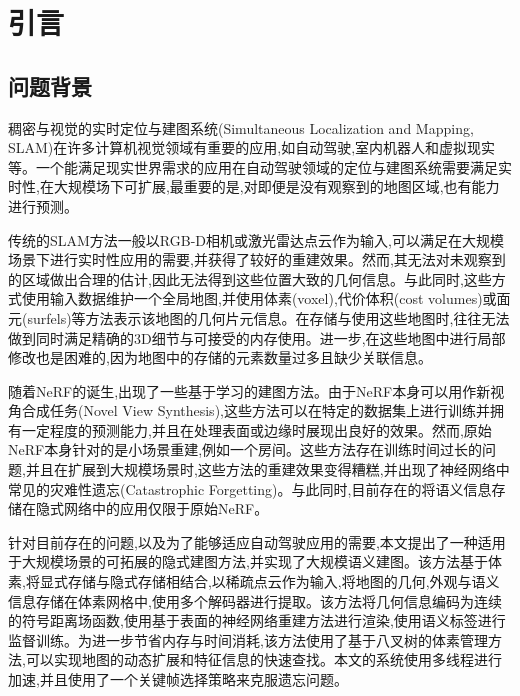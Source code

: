 \section{引言}\label{introduction}

\subsection{问题背景}

稠密与视觉的实时定位与建图系统(Simultaneous Localization and Mapping, SLAM)在许多计算机视觉领域有重要的应用,如自动驾驶,室内机器人和虚拟现实等。一个能满足现实世界需求的应用在自动驾驶领域的定位与建图系统需要满足实时性,在大规模场下可扩展,最重要的是,对即便是没有观察到的地图区域,也有能力进行预测。

传统的SLAM方法一般以RGB-D相机或激光雷达点云作为输入,可以满足在大规模场景下进行实时性应用的需要,并获得了较好的重建效果。然而,其无法对未观察到的区域做出合理的估计,因此无法得到这些位置大致的几何信息。与此同时,这些方式使用输入数据维护一个全局地图,并使用体素\cite{kahler}(voxel),代价体积\cite{learningDS}(cost volumes)或面元\cite{FusionDS}(surfels)等方法表示该地图的几何片元信息。在存储与使用这些地图时,往往无法做到同时满足精确的3D细节与可接受的内存使用。进一步,在这些地图中进行局部修改也是困难的,因为地图中的存储的元素数量过多且缺少关联信息。

随着NeRF\cite{nerf}的诞生,出现了一些基于学习的建图方法。由于NeRF本身可以用作新视角合成任务(Novel View Synthesis),这些方法可以在特定的数据集上进行训练并拥有一定程度的预测能力,并且在处理表面或边缘时展现出良好的效果。然而,原始NeRF本身针对的是小场景重建,例如一个房间。这些方法存在训练时间过长的问题,并且在扩展到大规模场景时,这些方法的重建效果变得糟糕,并出现了神经网络中常见的灾难性遗忘(Catastrophic Forgetting)。与此同时,目前存在的将语义信息存储在隐式网络中的应用仅限于原始NeRF。

针对目前存在的问题,以及为了能够适应自动驾驶应用的需要,本文提出了一种适用于大规模场景的可拓展的隐式建图方法,并实现了大规模语义建图。该方法基于体素,将显式存储与隐式存储相结合,以稀疏点云作为输入,将地图的几何,外观与语义信息存储在体素网格中,使用多个解码器进行提取。该方法将几何信息编码为连续的符号距离场函数,使用基于表面的神经网络重建方法进行渲染,使用语义标签进行监督训练。为进一步节省内存与时间消耗,该方法使用了基于八叉树的体素管理方法,可以实现地图的动态扩展和特征信息的快速查找。本文的系统使用多线程进行加速,并且使用了一个关键帧选择策略来克服遗忘问题。
